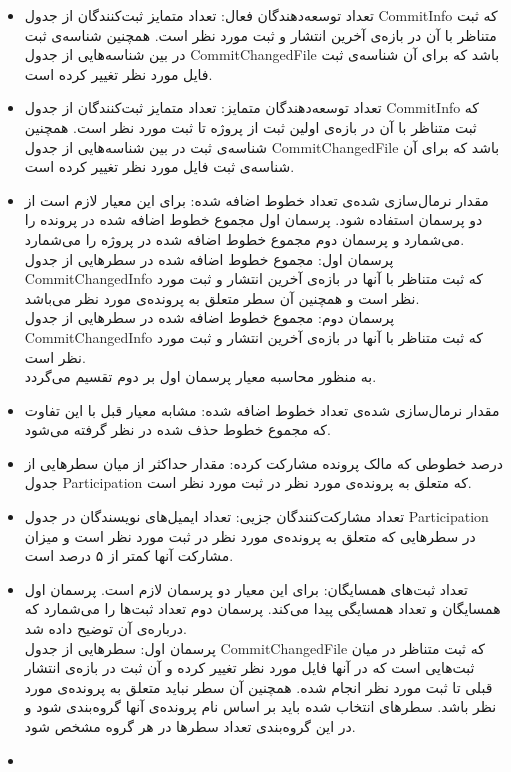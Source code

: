 \begin{itemize}
	\item 
	تعداد توسعه‌دهندگان فعال:  تعداد متمایز ثبت‌کنند‌گان از جدول CommitInfo که ثبت متناظر با آن در بازه‌ی آخرین انتشار و ثبت مورد نظر است. همچنین  شناسه‌ی ثبت در بین شناسه‌هایی از جدول CommitChangedFile باشد که برای آن شناسه‌ی ثبت فایل مورد نظر تغییر کرده است.
	\item
	تعداد توسعه‌دهندگان متمایز: تعداد متمایز ثبت‌کنند‌گان از جدول CommitInfo که ثبت متناظر با آن در بازه‌ی  اولین ثبت از پروژه تا ثبت مورد نظر است. همچنین  شناسه‌ی ثبت در بین شناسه‌هایی از جدول CommitChangedFile باشد که برای آن شناسه‌ی ثبت فایل مورد نظر تغییر کرده است.  
	\item
	مقدار نرمال‌سازی شده‌ی تعداد خطوط اضافه شده: برای این معیار لازم است از دو پرسمان استفاده شود. پرسمان اول مجموع خطوط اضافه شده در پرونده را می‌شمارد و پرسمان دوم مجموع خطوط اضافه شده در پروژه را می‌شمارد.\\
	پرسمان اول: مجموع خطوط اضافه شده در سطرهایی از جدول CommitChangedInfo که ثبت متناظر با آنها در بازه‌ی آخرین انتشار و ثبت مورد نظر است و همچنین آن سطر متعلق به پرونده‌ی مورد نظر می‌باشد. \\
	پرسمان دوم: مجموع خطوط اضافه شده در سطرهایی از جدول CommitChangedInfo که ثبت متناظر با آنها در بازه‌ی آخرین انتشار و ثبت مورد نظر است.\\
	به منظور محاسبه معیار پرسمان اول بر دوم تقسیم می‌گردد. 
\item
مقدار نرمال‌سازی شده‌ی تعداد خطوط اضافه شده: مشابه معیار قبل با این تفاوت که مجموع خطوط حذف شده در نظر گرفته می‌شود. 
\item
درصد خطوطی که مالک پرونده مشارکت کرده: مقدار حداکثر از میان سطرهایی  از جدول Participation که متعلق به پرونده‌ی مورد نظر در ثبت مورد نظر است. 
\item 
تعداد مشارکت‌کنندگان جزیی: تعداد ایمیل‌های نویسندگان در جدول Participation در سطرهایی که متعلق به پرونده‌ی مورد نظر در ثبت مورد نظر است و میزان مشارکت آنها کمتر از ۵ درصد است. 
\item
تعداد ثبت‌های همسایگان: برای این معیار دو پرسمان لازم است. پرسمان اول همسایگان و تعداد همسایگی پیدا می‌کند. پرسمان دوم تعداد ثبت‌ها را می‌شمارد که درباره‌ی آن توضیح داده شد. \\
پرسمان اول: سطرهایی از جدول CommitChangedFile که ثبت متناظر در میان ثبت‌هایی است که در آنها فایل مورد نظر تغییر کرده و آن ثبت در بازه‌ی انتشار قبلی تا ثبت مورد نظر انجام شده. همچنین آن سطر نباید متعلق به پرونده‌ی مورد نظر باشد. سطر‌های انتخاب شده باید بر اساس نام پرونده‌ی آنها گروه‌بندی شود و در این گروه‌بندی تعداد سطر‌ها در هر گروه مشخص شود. 
\item

\end{itemize}
